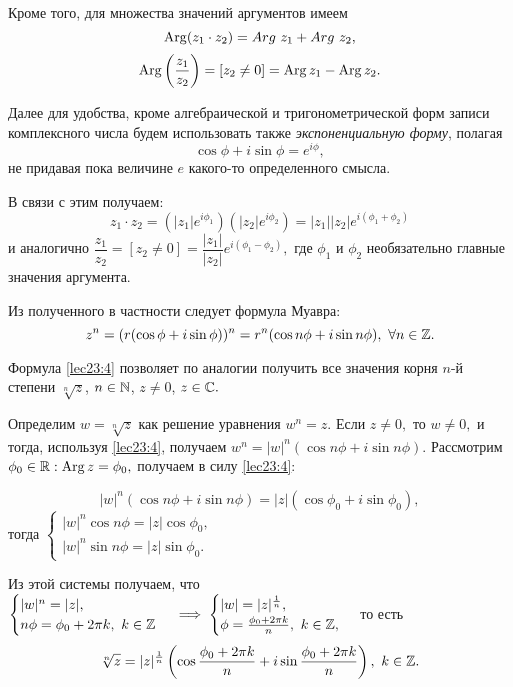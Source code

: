 \documentclass[../../main.tex]{subfiles}
\begin{document}
	Кроме того, для множества значений аргументов имеем 
	\[\Arg (z_1\cdot z_2) = Arg\ z_1 + Arg\ z_2,\]
	\[\operatorname{Arg} \left(\frac{z_1}{z_2}\right) =[z_2 \neq 0] = \operatorname{Arg} z_1 - \operatorname{Arg} z_2.\]
	
	Далее для удобства, кроме алгебраической и тригонометрической форм записи
	комплексного числа будем использовать также \emph{экспоненциальную форму},
	полагая \[\cos \phi + i \sin\phi = e^{i\phi},\] не придавая пока
	величине $e$ какого-то определенного смысла.
	
	В связи с этим получаем:
	\[z_1\cdot z_2 = \left(|z_1| e^{i{\phi}_1}\right)
	\left(|z_2| e^{i{\phi}_2}\right) = |z_1||z_2| e^{i({\phi}_1+{\phi}_2)} \]
	и аналогично $\dfrac{z_1}{z_2} =  [z_2 \neq 0] = \dfrac{|z_1|}{|z_2|} 
	e^{i({\phi}_1-{\phi}_2)},$ где ${\phi}_1$ и ${\phi}_2$ необязательно 
	главные значения аргумента.
	
	Из полученного в частности следует формула Муавра:
	\begin{equation}
	\label{lec23:4}
	z^n = (r(\cos \phi + i\sin \phi))^n = r^n(\cos n\phi + i\sin n\phi),\
    \forall n\in \mathbb{Z}.
	\end{equation}
	
	Формула \eqref{lec23:4} позволяет по аналогии получить все значения корня
	$n$-й степени $\sqrt[n]{z}$, $n\in\mathbb{N}$, $z\neq 0$, $z\in \mathbb{C}.$
	
	Определим $w = \sqrt[n]{z}$  как решение уравнения $w^n = z.$ Если 
	$z\neq 0,$ то $w\neq 0,$ и тогда, используя \eqref{lec23:4}, получаем
	$w^n = |w|^n(\cos n\phi + i\sin n\phi).$ Рассмотрим ${\phi}_0\in\mathbb{R}:
	\operatorname{Arg} z = {\phi}_0,$ получаем в силу  \eqref{lec23:4}:
	
	\begin{equation}
	\label{lec23:5}
	|w|^n (\cos n\phi + i\sin n\phi) = |z| (\cos {\phi}_0 + i\sin {\phi}_0),
	\end{equation}
	тогда $\begin{cases} 
	|w|^n \cos n\phi =  |z| \cos {\phi}_0,\\
	|w|^n \sin n\phi  = |z| \sin {\phi}_0.
	\end{cases}$
	
	Из этой системы получаем, что 
	$\begin{cases} 
	|w|^n =  |z|,\\
	n\phi  = {\phi}_0 + 2\pi k,\ k\in\mathbb{Z}
	\end{cases} \implies 
	\begin{cases} 
	|w| =  |z|^{\frac{1}{n}},\\
	\phi  = \frac{{\phi}_0 + 2\pi k}{n},\ k\in\mathbb{Z},
	\end{cases}$ то есть \begin{equation}
	\label{lec23:6}
	\sqrt[n]{z} = |z|^{\frac{1}{n}}\left(\cos\frac{{\phi}_0 + 2\pi k}{n}
	 + i\sin \frac{{\phi}_0 + 2\pi k}{n} \right),\ k\in\mathbb{Z}.
	\end{equation}
	
\end{document}
